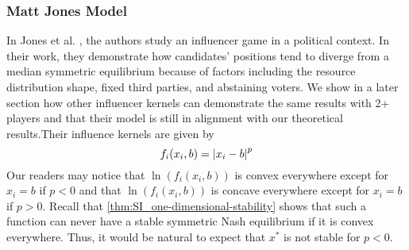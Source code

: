 \documentclass{article}
\begin{document}
            \subsubsection{Matt Jones Model}
                In Jones et al. \cite{jones2022polarization}, the authors study an influencer game in a political context. In their work, they demonstrate how candidates' positions tend to diverge from a median symmetric equilibrium because of factors including the resource distribution shape, fixed third parties, and abstaining voters. We show in a later section how other influencer kernels can demonstrate the same results with 2+ players and that their model is still in alignment with our theoretical results.Their influence kernels are given by 
                \begin{equation}\label{eq:SI_Jones_influence_kernel}
                    f_i(x_i,b)=\abs{x_i-b}^p
                \end{equation}
                Our readers may notice that $\ln(f_i(x_i,b))$ is convex everywhere except for $x_i=b$ if $p<0$ and that $\ln(f_i(x_i,b))$ is concave everywhere except for $x_i=b$ if $p>0$. Recall that \cref{thm:SI_one-dimensional-stability} shows that such a function can never have a stable symmetric Nash equilibrium if it is convex everywhere. Thus, it would be natural to expect that $x^*$ is not stable for $p<0$.
\end{document}
